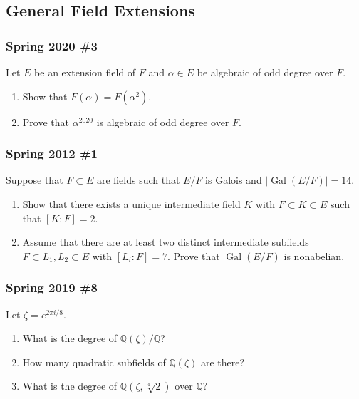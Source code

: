 \hypertarget{general-field-extensions}{%
\subsection{General Field Extensions}\label{general-field-extensions}}

\hypertarget{spring-2020-3}{%
\subsubsection{Spring 2020 \#3}\label{spring-2020-3}}

Let \(E\) be an extension field of \(F\) and \(\alpha\in E\) be
algebraic of odd degree over \(F\).

\begin{enumerate}
\def\labelenumi{\alph{enumi}.}
\item
  Show that \(F(\alpha) = F(\alpha^2)\).
\item
  Prove that \(\alpha^{2020}\) is algebraic of odd degree over \(F\).
\end{enumerate}

\hypertarget{spring-2012-1}{%
\subsubsection{Spring 2012 \#1}\label{spring-2012-1}}

Suppose that \(F\subset E\) are fields such that \(E/F\) is Galois and
\({\left\lvert {{ \operatorname{Gal}} (E/F)} \right\rvert} = 14\).

\begin{enumerate}
\def\labelenumi{\alph{enumi}.}
\item
  Show that there exists a unique intermediate field \(K\) with
  \(F\subset K \subset E\) such that \([K: F] = 2\).
\item
  Assume that there are at least two distinct intermediate subfields
  \(F \subset L_1, L_2 \subset E\) with \([L_i: F]= 7\). Prove that
  \({ \operatorname{Gal}} (E/F)\) is nonabelian.
\end{enumerate}

\hypertarget{spring-2019-8}{%
\subsubsection{Spring 2019 \#8}\label{spring-2019-8}}

Let \(\zeta = e^{2\pi i/8}\).

\begin{enumerate}
\def\labelenumi{\alph{enumi}.}
\item
  What is the degree of \({\mathbb{Q}}(\zeta)/{\mathbb{Q}}\)?
\item
  How many quadratic subfields of \({\mathbb{Q}}(\zeta)\) are there?
\item
  What is the degree of \({\mathbb{Q}}(\zeta, \sqrt[4] 2)\) over
  \({\mathbb{Q}}\)?
\end{enumerate}

